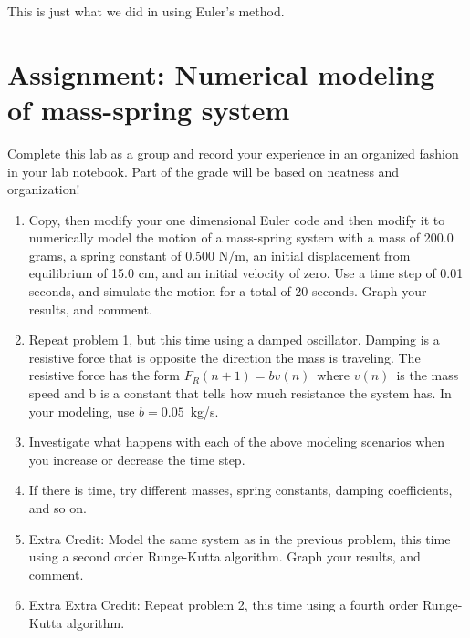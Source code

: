 \documentclass[twoside,11pt,ShortChapTitles]{BYUTextbook}
\begin{document}
This is just what we did in using Euler's method.

\pagebreak

\section{Assignment: Numerical modeling of mass-spring system}

{\small Complete this lab as a group and record your experience in an
organized fashion in your lab notebook. Part of the grade will be based on
neatness and organization!}

\begin{enumerate}
\item {\small Copy, then modify your one dimensional Euler code and then
modify it to numerically model the motion of a mass-spring system with a
mass of 200.0 grams, a spring constant of 0.500 N/m, an initial displacement
from equilibrium of 15.0 cm, and an initial velocity of zero. Use a time
step of 0.01 seconds, and simulate the motion for a total of 20 seconds.
Graph your results, and comment.}

\item {\small Repeat problem 1, but this time using a damped oscillator.
Damping is a resistive force that is opposite the direction the mass is
traveling. The resistive force has the form }$F_{R}\left( n+1\right)
=bv\left( n\right) ${\small \ where }$v\left( n\right) ${\small \ is the
mass speed and b is a constant that tells how much resistance the system has.%
} {\small In your modeling, use }$b=0.05${\small \ kg/s.}

\item {\small Investigate what happens with each of the above modeling
scenarios when you increase or decrease the time step.}

\item {\small If there is time, try different masses, spring constants,
damping coefficients, and so on.}

\item {\small Extra Credit: Model the same system as in the previous
problem, this time using a second order Runge-Kutta algorithm. Graph your
results, and comment.}

\item {\small Extra Extra Credit: Repeat problem 2, this time using a fourth
order Runge-Kutta algorithm.}
\end{enumerate}
\end{document}
